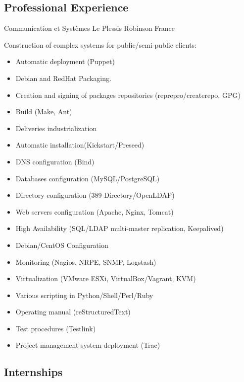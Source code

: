 \documentclass[10pt,a4paper]{moderncv}
\begin{document}
\subsection{Professional Experience}

              {Communication et Systèmes}
              {Le Plessis Robinson}
              {France}
              {Construction of complex systems for public/semi-public clients:
                \begin{itemize}
                \item Automatic deployment (Puppet)
                \item Debian and RedHat Packaging.
                \item Creation and signing of packages repositories (reprepro/createrepo, GPG)
                \item Build (Make, Ant)
                \item Deliveries industrialization
                \item Automatic installation(Kickstart/Preseed)
                \item DNS configuration (Bind)
                \item Databases configuration (MySQL/PostgreSQL)
                \item Directory configuration (389 Directory/OpenLDAP)
                \item Web servers configuration (Apache, Nginx, Tomcat)
                \item High Availability (SQL/LDAP multi-master replication, Keepalived)
                \item Debian/CentOS Configuration
                \item Monitoring (Nagios, NRPE, SNMP, Logstash)
                \item Virtualization (VMware ESXi, VirtualBox/Vagrant, KVM)
                \item Various scripting in Python/Shell/Perl/Ruby
                \item Operating manual (reStructuredText)
                \item Test procedures (Testlink)
                \item Project management system deployment (Trac)
                \end{itemize}
              }

\subsection{Internships}
\end{document}
